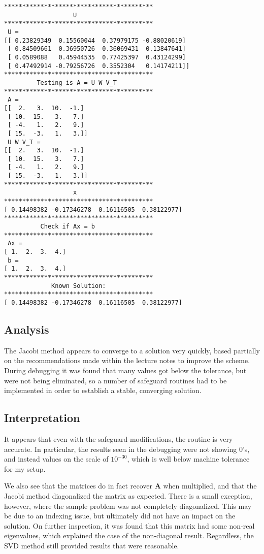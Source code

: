 \documentclass[10pt,letter]{article}
\begin{document}
\begin{verbatim}
*****************************************
                   U                     
*****************************************
 U = 
[[ 0.23829349  0.15560044  0.37979175 -0.88020619]
 [ 0.84509661  0.36950726 -0.36069431  0.13847641]
 [ 0.0589088   0.45944535  0.77425397  0.43124299]
 [ 0.47492914 -0.79256726  0.3552304   0.14174211]]
*****************************************
         Testing is A = U W V_T          
*****************************************
 A = 
[[  2.   3.  10.  -1.]
 [ 10.  15.   3.   7.]
 [ -4.   1.   2.   9.]
 [ 15.  -3.   1.   3.]]
 U W V_T = 
[[  2.   3.  10.  -1.]
 [ 10.  15.   3.   7.]
 [ -4.   1.   2.   9.]
 [ 15.  -3.   1.   3.]]
*****************************************
                   x                     
*****************************************
[ 0.14498382 -0.17346278  0.16116505  0.38122977]
*****************************************
          Check if Ax = b                
*****************************************
 Ax = 
[ 1.  2.  3.  4.]
 b = 
[ 1.  2.  3.  4.]
*****************************************
             Known Solution:             
*****************************************
[ 0.14498382 -0.17346278  0.16116505  0.38122977]

\end{verbatim}

\subsection{Analysis}

The Jacobi method appears to converge to a solution very quickly, based partially on the recommendations made within the lecture notes to improve the scheme. During debugging it was found that many values got below the tolerance, but were not being eliminated, so a number of safeguard routines had to be implemented in order to establish a stable, converging solution.

\subsection{Interpretation}

It appears that even with the safeguard modifications, the routine is very accurate. In particular, the results seen in the debugging were not showing 0's, and instead values on the scale of $10^{-30}$, which is well below machine tolerance for my setup.

We also see that the matrices do in fact recover \textbf{A} when multiplied, and that the Jacobi method diagonalized the matrix as expected. There is a small exception, however, where the sample problem was not completely diagonalized. This may be due to an indexing issue, but ultimately did not have an impact on the solution. On further inspection, it was found that this matrix had some non-real eigenvalues, which explained the case of the non-diagonal result. Regardless, the SVD method still provided results that were reasonable.
\end{document}
